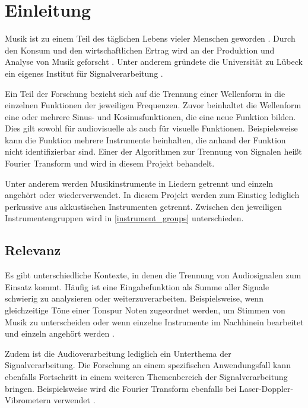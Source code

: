 \chapter{Einleitung}
%

Musik ist zu einem Teil des täglichen Lebens vieler Menschen geworden \parencite{musiknutzung}.
Durch den Konsum und den wirtschaftlichen Ertrag wird an der Produktion und Analyse von Musik geforscht \parencite{absatz}.
Unter anderem gründete die Universität zu Lübeck ein eigenes Institut für Signalverarbeitung \parencite{institute_for_signal_processing}.

\par

Ein Teil der Forschung bezieht sich auf die Trennung einer Wellenform in die einzelnen Funktionen der jeweiligen Frequenzen. Zuvor beinhaltet die Wellenform eine oder mehrere Sinus- und Kosinusfunktionen, die eine neue Funktion bilden. Dies gilt sowohl für audiovisuelle als auch für visuelle Funktionen. Beispielsweise kann die Funktion mehrere Instrumente beinhalten, die anhand der Funktion nicht identifizierbar sind. Einer der Algorithmen zur Trennung von Signalen heißt Fourier Transform und wird in diesem Projekt behandelt.

\par

Unter anderem werden Musikinstrumente in Liedern getrennt und einzeln angehört oder wiederverwendet. In diesem Projekt werden zum Einstieg lediglich perkussive aus akkustischen Instrumenten getrennt. Zwischen den jeweiligen Instrumentengruppen wird in \cref{instrument_groups} unterschieden.

%
\section{Relevanz}
%

Es gibt unterschiedliche Kontexte, in denen die Trennung von Audiosignalen zum Einsatz kommt. Häufig ist eine Eingabefunktion als Summe aller Signale schwierig zu analysieren oder weiterzuverarbeiten. Beispielsweise, wenn gleichzeitige Töne einer Tonspur Noten zugeordnet werden, um Stimmen von Musik zu unterscheiden oder wenn einzelne Instrumente im Nachhinein bearbeitet und einzeln angehört werden \parencite{importance_fourier}.

\par

Zudem ist die Audioverarbeitung lediglich ein Unterthema der Signalverarbeitung. Die Forschung an einem spezifischen Anwendungsfall kann ebenfalls Fortschritt in einem weiteren Themenbereich der Signalverarbeitung bringen. Beispielsweise wird die Fourier Transform ebenfalls bei Laser-Doppler-Vibrometern verwendet \parencite{Laser-Doppler-Vibrometer}.

